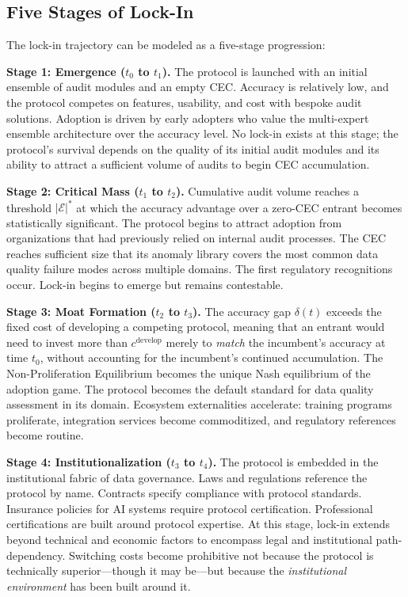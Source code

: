 \documentclass[12pt,a4paper]{article}
\theoremstyle{definition}
\theoremstyle{remark}
\begin{document}
\subsection{Five Stages of Lock-In}

The lock-in trajectory can be modeled as a five-stage progression:

\textbf{Stage 1: Emergence ($t_0$ to $t_1$).} The protocol is launched with an initial ensemble of audit modules and an empty CEC. Accuracy is relatively low, and the protocol competes on features, usability, and cost with bespoke audit solutions. Adoption is driven by early adopters who value the multi-expert ensemble architecture over the accuracy level. No lock-in exists at this stage; the protocol's survival depends on the quality of its initial audit modules and its ability to attract a sufficient volume of audits to begin CEC accumulation.

\textbf{Stage 2: Critical Mass ($t_1$ to $t_2$).} Cumulative audit volume reaches a threshold $|\mathcal{E}|^*$ at which the accuracy advantage over a zero-CEC entrant becomes statistically significant. The protocol begins to attract adoption from organizations that had previously relied on internal audit processes. The CEC reaches sufficient size that its anomaly library covers the most common data quality failure modes across multiple domains. The first regulatory recognitions occur. Lock-in begins to emerge but remains contestable.

\textbf{Stage 3: Moat Formation ($t_2$ to $t_3$).} The accuracy gap $\delta(t)$ exceeds the fixed cost of developing a competing protocol, meaning that an entrant would need to invest more than $c^{\text{develop}}$ merely to \textit{match} the incumbent's accuracy at time $t_0$, without accounting for the incumbent's continued accumulation. The Non-Proliferation Equilibrium becomes the unique Nash equilibrium of the adoption game. The protocol becomes the default standard for data quality assessment in its domain. Ecosystem externalities accelerate: training programs proliferate, integration services become commoditized, and regulatory references become routine.

\textbf{Stage 4: Institutionalization ($t_3$ to $t_4$).} The protocol is embedded in the institutional fabric of data governance. Laws and regulations reference the protocol by name. Contracts specify compliance with protocol standards. Insurance policies for AI systems require protocol certification. Professional certifications are built around protocol expertise. At this stage, lock-in extends beyond technical and economic factors to encompass legal and institutional path-dependency. Switching costs become prohibitive not because the protocol is technically superior—though it may be—but because the \textit{institutional environment} has been built around it.
\end{document}
